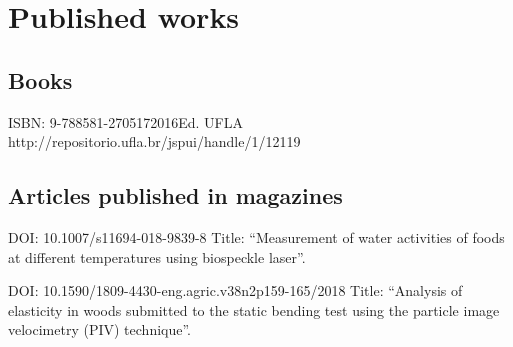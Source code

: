 \documentclass[11pt,a4paper,sans]{moderncv} %
\begin{document}




\section{Published works}
\subsection{Books}
	      {ISBN: 9-788581-270517}{2016}{Ed. UFLA}
	      {http://repositorio.ufla.br/jspui/handle/1/12119}

\subsection{Articles published in magazines}
	      {DOI: 10.1007/s11694-018-9839-8}{}{}
	      {Title: ``Measurement of water activities of foods at different temperatures using biospeckle laser''.}

	      {DOI: 10.1590/1809-4430-eng.agric.v38n2p159-165/2018}{}{}
	      {Title: ``Analysis of elasticity in woods submitted to the static bending test using the particle image velocimetry (PIV) technique''.}
\end{document}
